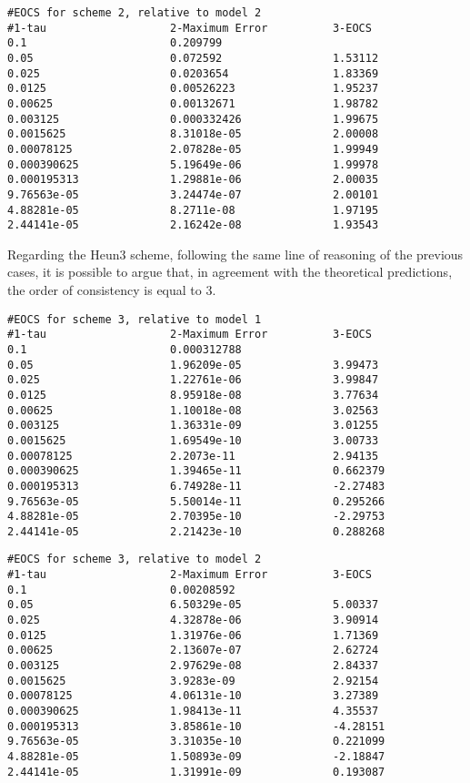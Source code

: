 \documentclass[11pt]{article}
\theoremstyle{theorem}
\theoremstyle{definition}
\begin{document}
\begin{lstlisting}
#EOCS for scheme 2, relative to model 2
#1-tau                   2-Maximum Error          3-EOCS                   
0.1                      0.209799                 	
0.05                     0.072592                 1.53112
0.025                    0.0203654                1.83369
0.0125                   0.00526223               1.95237
0.00625                  0.00132671               1.98782
0.003125                 0.000332426              1.99675
0.0015625                8.31018e-05              2.00008
0.00078125               2.07828e-05              1.99949
0.000390625              5.19649e-06              1.99978
0.000195313              1.29881e-06              2.00035
9.76563e-05              3.24474e-07              2.00101
4.88281e-05              8.2711e-08               1.97195
2.44141e-05              2.16242e-08              1.93543
\end{lstlisting}

Regarding the Heun3 scheme, following the same line of reasoning of the previous cases, it is possible to argue that, in agreement with the theoretical predictions, the order of consistency is equal to 3.\\

\begin{lstlisting}
#EOCS for scheme 3, relative to model 1
#1-tau                   2-Maximum Error          3-EOCS                   
0.1                      0.000312788              	
0.05                     1.96209e-05              3.99473
0.025                    1.22761e-06              3.99847
0.0125                   8.95918e-08              3.77634
0.00625                  1.10018e-08              3.02563
0.003125                 1.36331e-09              3.01255
0.0015625                1.69549e-10              3.00733
0.00078125               2.2073e-11               2.94135
0.000390625              1.39465e-11              0.662379
0.000195313              6.74928e-11              -2.27483
9.76563e-05              5.50014e-11              0.295266
4.88281e-05              2.70395e-10              -2.29753
2.44141e-05              2.21423e-10              0.288268
\end{lstlisting}

\begin{lstlisting}
#EOCS for scheme 3, relative to model 2
#1-tau                   2-Maximum Error          3-EOCS                   
0.1                      0.00208592               	
0.05                     6.50329e-05              5.00337
0.025                    4.32878e-06              3.90914
0.0125                   1.31976e-06              1.71369
0.00625                  2.13607e-07              2.62724
0.003125                 2.97629e-08              2.84337
0.0015625                3.9283e-09               2.92154
0.00078125               4.06131e-10              3.27389
0.000390625              1.98413e-11              4.35537
0.000195313              3.85861e-10              -4.28151
9.76563e-05              3.31035e-10              0.221099
4.88281e-05              1.50893e-09              -2.18847
2.44141e-05              1.31991e-09              0.193087
\end{lstlisting}
\end{document}
